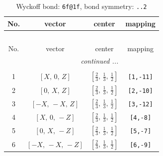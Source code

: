 \documentclass[fleqn,8pt]{jsarticle}
\begin{document}
\begin{longtable}{cccc}
\caption{Wyckoff bond: {\tt 6f@1f}, bond symmetry: {\tt ..2}}
 \\
 \hline \hline
No. & vector & center & mapping \\ \hline \endfirsthead

\multicolumn{3}{l}{\tablename\ \thetable{}} \\
 \hline \hline
No. & vector & center & mapping \\ \hline \endhead

 \hline \hline
\multicolumn{3}{r}{\footnotesize\it continued ...} \\ \endfoot

 \hline \hline
\multicolumn{3}{r}{} \\ \endlastfoot

1 & $\left[ X,\, 0,\, Z \right]$ & $\left[ \frac{2}{3},\, \frac{1}{3},\, \frac{1}{2} \right]$ & {\tt [1,-11]} \\ \hline
2 & $\left[ 0,\, X,\, Z \right]$ & $\left[ \frac{2}{3},\, \frac{1}{3},\, \frac{1}{2} \right]$ & {\tt [2,-10]} \\ \hline
3 & $\left[ - X,\, - X,\, Z \right]$ & $\left[ \frac{2}{3},\, \frac{1}{3},\, \frac{1}{2} \right]$ & {\tt [3,-12]} \\ \hline
4 & $\left[ X,\, 0,\, - Z \right]$ & $\left[ \frac{2}{3},\, \frac{1}{3},\, \frac{1}{2} \right]$ & {\tt [4,-8]} \\ \hline
5 & $\left[ 0,\, X,\, - Z \right]$ & $\left[ \frac{2}{3},\, \frac{1}{3},\, \frac{1}{2} \right]$ & {\tt [5,-7]} \\ \hline
6 & $\left[ - X,\, - X,\, - Z \right]$ & $\left[ \frac{2}{3},\, \frac{1}{3},\, \frac{1}{2} \right]$ & {\tt [6,-9]} \\
\end{longtable}
\renewcommand{\arraystretch}{1.2}
\end{document}
